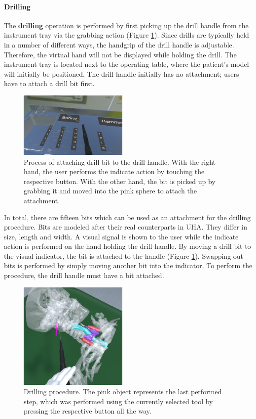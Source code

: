 \paragraph{Drilling}

The \textbf{drilling} operation is performed by first picking up the drill handle from the instrument tray via the grabbing action (Figure \ref{fig::FeatureDrillingAttachments}).
Since drills are typically held in a number of different ways, the handgrip of the drill handle is adjustable.
Therefore, the virtual hand will not be displayed while holding the drill.
The instrument tray is located next to the operating table, where the patient's model will initially be positioned.
The drill handle initially has no attachment; users have to attach a drill bit first.

\begin{figure}[ht]
    \centering
    \includegraphics[width=200px]{images/implementation/features/procedures/drilling_attachment.png}
    \caption{\label{fig::FeatureDrillingAttachments}Process of attaching drill bit to the drill handle. With the right hand, the user performs the indicate action by touching 
    the respective button. With the other hand, the bit is picked up by grabbing it and moved into the pink sphere to attach the attachment.}
\end{figure}

In total, there are fifteen bits which can be used as an attachment for the drilling procedure.
Bits are modeled after their real counterparts in UHA.
They differ in size, length and width.
A visual signal is shown to the user while the indicate action is performed on the hand holding the drill handle.
By moving a drill bit to the visual indicator, the bit is attached to the handle (Figure \ref{fig::FeatureDrillingAttachments}).
Swapping out bits is performed by simply moving another bit into the indicator.
To perform the procedure, the drill handle must have a bit attached. 

\begin{figure}[ht]
    \centering
    \includegraphics[width=200px]{images/implementation/features/procedures/drilling.png}
    \caption{\label{fig::FeatureDrilling}Drilling procedure. The pink object represents the last performed step, which was performed using the currently selected tool by pressing 
    the respective button all the way.}
\end{figure}

